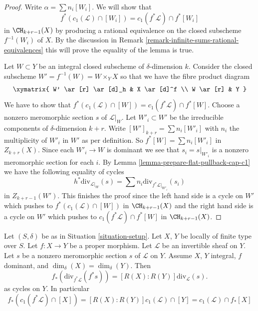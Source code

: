 \begin{proof}
Write $\alpha = \sum n_i[W_i]$. We will show that
$$
f^*(c_1(\mathcal{L}) \cap [W_i]) = c_1(f^*\mathcal{L}) \cap f^*[W_i]
$$
in $\CH_{k + r - 1}(X)$ by producing a rational equivalence
on the closed subscheme $f^{-1}(W_i)$ of $X$.
By the discussion in
Remark \ref{remark-infinite-sums-rational-equivalences}
this will prove the equality of the lemma is true.

\medskip\noindent
Let $W \subset Y$ be an integral closed subscheme of $\delta$-dimension $k$.
Consider the closed subscheme $W' = f^{-1}(W) = W \times_Y X$
so that we have the fibre product diagram
$$
\xymatrix{
W' \ar[r] \ar[d]_h & X \ar[d]^f \\
W \ar[r] & Y
}
$$
We have to show that
$f^*(c_1(\mathcal{L}) \cap [W]) = c_1(f^*\mathcal{L}) \cap f^*[W]$.
Choose a nonzero meromorphic section $s$ of $\mathcal{L}|_W$.
Let $W'_i \subset W'$ be the irreducible components of
$\delta$-dimension $k + r$. Write $[W']_{k + r} = \sum n_i[W'_i]$
with $n_i$ the multiplicity of $W'_i$ in $W'$ as per definition.
So $f^*[W] = \sum n_i[W'_i]$ in $Z_{k + r}(X)$.
Since each $W'_i \to W$ is dominant we
see that $s_i = s|_{W'_i}$ is a nonzero meromorphic section for
each $i$. By Lemma \ref{lemma-prepare-flat-pullback-cap-c1}
we have the following equality of cycles
$$
h^*\text{div}_{\mathcal{L}|_W}(s) =
\sum n_i\text{div}_{f^*\mathcal{L}|_{W'_i}}(s_i)
$$
in $Z_{k + r - 1}(W')$. This finishes the proof since
the left hand side is a cycle on $W'$ which pushes to
$f^*(c_1(\mathcal{L}) \cap [W])$ in $\CH_{k + r - 1}(X)$
and the right hand side is a cycle on $W'$ which pushes to
$c_1(f^*\mathcal{L}) \cap f^*[W]$ in $\CH_{k + r - 1}(X)$.
\end{proof}

\begin{lemma}
\label{lemma-equal-c1-as-cycles}
Let $(S, \delta)$ be as in Situation \ref{situation-setup}.
Let $X$, $Y$ be locally of finite type over $S$.
Let $f : X \to Y$ be a proper morphism.
Let $\mathcal{L}$ be an invertible sheaf on $Y$.
Let $s$ be a nonzero meromorphic section $s$ of $\mathcal{L}$ on $Y$.
Assume $X$, $Y$ integral, $f$ dominant, and $\dim_\delta(X) = \dim_\delta(Y)$.
Then
$$
f_*\left(\text{div}_{f^*\mathcal{L}}(f^*s)\right) =
[R(X) : R(Y)]\text{div}_\mathcal{L}(s).
$$
as cycles on $Y$. In particular
$$
f_*(c_1(f^*\mathcal{L}) \cap [X]) =
[R(X) : R(Y)] c_1(\mathcal{L}) \cap [Y] =
c_1(\mathcal{L}) \cap f_*[X]
$$
\end{lemma}

